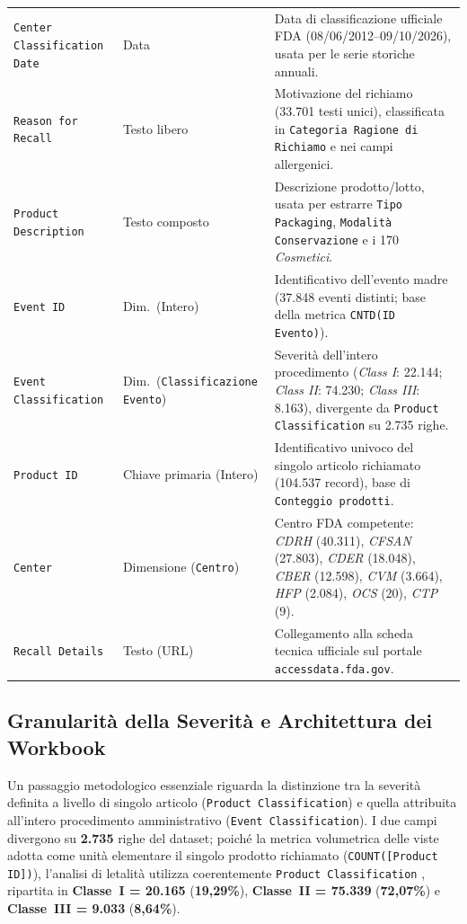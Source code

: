 \begin{table}[htbp]
\begin{tabularx}{\textwidth}{@{}>{\raggedright\arraybackslash}p{3.5cm}>{\raggedright\arraybackslash}p{2.9cm}>{\raggedright\arraybackslash}X@{}}
\texttt{Center Classification Date} & Data & Data di classificazione ufficiale FDA (08/06/2012--09/10/2026), usata per le serie storiche annuali. \\
\texttt{Reason for Recall} & Testo libero & Motivazione del richiamo (33.701 testi unici), classificata in \texttt{Categoria Ragione di Richiamo} e nei campi allergenici. \\
\texttt{Product Description} & Testo composto & Descrizione prodotto/lotto, usata per estrarre \texttt{Tipo Packaging}, \texttt{Modalità Conservazione} e i 170 \textit{Cosmetici}. \\
\texttt{Event ID} & Dim.\ (Intero) & Identificativo dell'evento madre (37.848 eventi distinti; base della metrica \texttt{CNTD(ID Evento)}). \\
\texttt{Event Classification} & Dim.\ (\texttt{Classificazione Evento}) & Severità dell'intero procedimento (\textit{Class I}: 22.144; \textit{Class II}: 74.230; \textit{Class III}: 8.163), divergente da \texttt{Product Classification} su 2.735 righe. \\
\texttt{Product ID} & Chiave primaria (Intero) & Identificativo univoco del singolo articolo richiamato (104.537 record), base di \texttt{Conteggio prodotti}. \\
\texttt{Center} & Dimensione (\texttt{Centro}) & Centro FDA competente: \textit{CDRH} (40.311), \textit{CFSAN} (27.803), \textit{CDER} (18.048), \textit{CBER} (12.598), \textit{CVM} (3.664), \textit{HFP} (2.084), \textit{OCS} (20), \textit{CTP} (9). \\
\texttt{Recall Details} & Testo (URL) & Collegamento alla scheda tecnica ufficiale sul portale \texttt{accessdata.fda.gov}. \\
\bottomrule
\end{tabularx}
\end{table}

\subsection{Granularità della Severità e Architettura dei Workbook}
Un passaggio metodologico essenziale riguarda la distinzione tra la severità definita a livello di singolo articolo (\texttt{Product Classification}) e quella attribuita all'intero procedimento amministrativo (\texttt{Event Classification}). I due campi divergono su \textbf{2.735} righe del dataset; poiché la metrica volumetrica delle viste adotta come unità elementare il singolo prodotto richiamato (\texttt{COUNT([Product ID])}), l'analisi di letalità utilizza coerentemente \texttt{Product Classification} \citep{fda_recall_classes}, ripartita in \textbf{Classe~I = 20.165} (\textbf{19,29\%}), \textbf{Classe~II = 75.339} (\textbf{72,07\%}) e \textbf{Classe~III = 9.033} (\textbf{8,64\%}).

